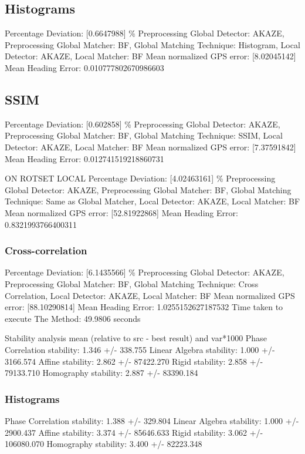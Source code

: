 \subsection*{Histograms}
Percentage Deviation: [0.6647988] \%
Preprocessing Global Detector: AKAZE, Preprocessing Global Matcher: BF, Global Matching Technique: Histogram, Local Detector: AKAZE, Local Matcher: BF
Mean normalized GPS error: [8.02045142]
 Mean Heading Error: 0.010777802670986603


\subsection*{SSIM}
Percentage Deviation: [0.602858] \%
Preprocessing Global Detector: AKAZE, Preprocessing Global Matcher: BF, Global Matching Technique: SSIM, Local Detector: AKAZE, Local Matcher: BF
Mean normalized GPS error: [7.37591842]
 Mean Heading Error: 0.012741519218860731


 ON ROTSET
 LOCAL
Percentage Deviation: [4.02463161] \%
Preprocessing Global Detector: AKAZE, Preprocessing Global Matcher: BF, Global Matching Technique: Same as Global Matcher, Local Detector: AKAZE, Local Matcher: BF
Mean normalized GPS error: [52.81922868]
Mean Heading Error: 0.8321993766400311



\subsubsection*{Cross-correlation}
Percentage Deviation: [6.1435566] \%
Preprocessing Global Detector: AKAZE, Preprocessing Global Matcher: BF, Global Matching Technique: Cross Correlation, Local Detector: AKAZE, Local Matcher: BF
Mean normalized GPS error: [88.10290814]
 Mean Heading Error: 1.0255152627187532
Time taken to execute The Method: 49.9806 seconds

Stability analysis mean (relative to src - best result) and var*1000
Phase Correlation stability: 1.346 +/- 338.755
Linear Algebra stability: 1.000 +/- 3166.574
Affine stability: 2.862 +/- 87422.270
Rigid stability: 2.858 +/- 79133.710
Homography stability: 2.887 +/- 83390.184

\subsubsection*{Histograms}
Phase Correlation stability: 1.388 +/- 329.804
Linear Algebra stability: 1.000 +/- 2900.437
Affine stability: 3.374 +/- 85646.633
Rigid stability: 3.062 +/- 106080.070
Homography stability: 3.400 +/- 82223.348

